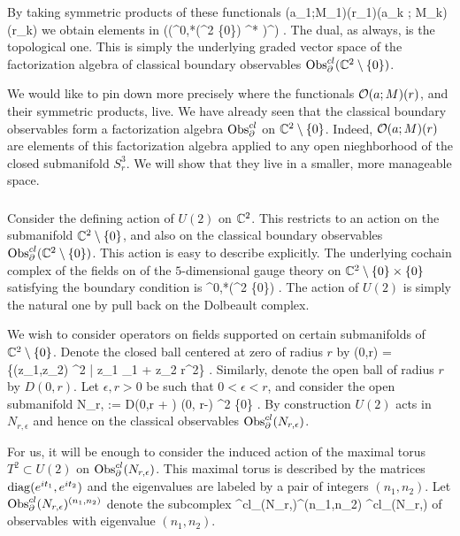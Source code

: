 By taking symmetric products of these functionals 
\ben
\cO(a_1;M_1)(r_1)\cdots \cO(a_k ; M_k)(r_k)
\een
we obtain elements in 
\ben
\Sym \left(\left(\Omega^{0,*}(\CC^2 \setminus \{0\}) \tensor \fg^* \right)^\vee [-1] \right) .
\een
The dual, as always, is the topological one. 
This is simply the underlying graded vector space of the factorization algebra of classical boundary observables ${\rm Obs}^{cl}_\partial(\mathbb C^2 \setminus \{0\})$. 

We would like to pin down more precisely where the functionals $\mathcal O(a; M)(r)$, and their symmetric products, live.
We have already seen that the classical boundary observables form a factorization algebra ${\rm Obs}^{cl}_\partial$ on $\mathbb C^2 \setminus \{0\}$. 
Indeed, $\mathcal O(a; M)(r)$ are elements of this factorization algebra applied to any open nieghborhood of the closed submanifold $S^3_r$. 
We will show that they live in a smaller, more manageable space. 

\subsubsection{}

Consider the defining action of $U(2)$ on $\mathbb C^2$. 
This restricts to an action on the submanifold $\mathbb C^2 \setminus \{0\}$, and also on the classical boundary observables ${\rm Obs}^{cl}_{\partial}(\mathbb C^2 \setminus \{0\})$. 
This action is easy to describe explicitly. 
The underlying cochain complex of the fields on of the $5$-dimensional gauge theory on $\mathbb C^2 \setminus \{0\} \times \{0\}$ satisfying the boundary condition is 
\ben
\Omega^{0,*}(\CC^2 \setminus \{0\}) \tensor \fg [1] .
\een 
The action of $U(2)$ is simply the natural one by pull back on the Dolbeault complex. 


We wish to consider operators on fields supported on certain submanifolds of $\mathbb C^2 \setminus \{0\}$.
Denote the closed ball centered at zero of radius $r$ by
\ben
{}(0,r) = \left\{(z_1,z_2) \in \CC^2 \; | \; z_1 _1 + z_2  \leq r^2\right\} . 
\een
Similarly, denote the open ball of radius $r$ by $D(0,r)$.
Let $\epsilon,r > 0$ be such that $0 < \epsilon < r$, and consider the open submanifold
\ben
N_{r, \epsilon} := D(0,r + \epsilon) \setminus {}(0, r-\epsilon) \subset \CC^2 \setminus \{0\} .
\een 
By construction $U(2)$ acts in $N_{r,\epsilon}$ and hence on the classical observables ${\rm Obs}^{cl}_\partial(N_{r,\epsilon})$. 

For us, it will be enough to consider the induced action of the maximal torus $T^2 \subset U(2)$ on ${\rm Obs}^{cl}_\partial(N_{r,\epsilon})$. 
This maximal torus is described by the matrices ${\rm diag}(e^{it_1}, e^{i t_2})$ and the eigenvalues are labeled by a pair of integers $(n_1,n_2)$. 
Let ${\rm Obs}^{cl}_{\partial}(N_{r,\epsilon})^{(n_1,n_2)} $ denote the subcomplex
\ben
\Obs^{cl}_{\partial}(N_{r,\epsilon})^{(n_1,n_2)} \subset \Obs^{cl}_\partial(N_{r,\epsilon})
\een
of observables with eigenvalue $(n_1,n_2)$. 

